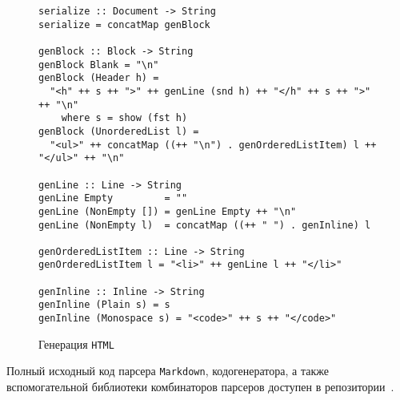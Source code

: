 \begin{figure}[h]
\begin{lstlisting}
serialize :: Document -> String
serialize = concatMap genBlock

genBlock :: Block -> String
genBlock Blank = "\n"
genBlock (Header h) =
  "<h" ++ s ++ ">" ++ genLine (snd h) ++ "</h" ++ s ++ ">" ++ "\n"
    where s = show (fst h)
genBlock (UnorderedList l) =
  "<ul>" ++ concatMap ((++ "\n") . genOrderedListItem) l ++ "</ul>" ++ "\n"

genLine :: Line -> String
genLine Empty         = ""
genLine (NonEmpty []) = genLine Empty ++ "\n"
genLine (NonEmpty l)  = concatMap ((++ " ") . genInline) l

genOrderedListItem :: Line -> String
genOrderedListItem l = "<li>" ++ genLine l ++ "</li>"

genInline :: Inline -> String
genInline (Plain s) = s
genInline (Monospace s) = "<code>" ++ s ++ "</code>"
\end{lstlisting}
\caption{Генерация \lstinline{HTML}}
\label{listing:HTMLGen}
\end{figure}

Полный исходный код парсера \lstinline{Markdown}, кодогенератора, а также вспомогательной библиотеки комбинаторов парсеров доступен в репозитории~\cite{mdParse}. 

\printbibliography[heading=bibintoc%
]


